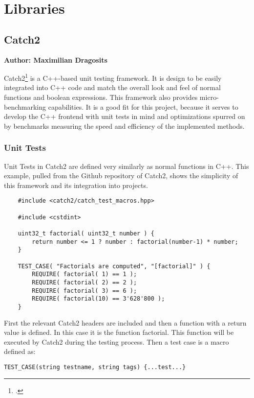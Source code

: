 \section{Libraries}

\subsection{Catch2}
\textbf{Author: Maximilian Dragosits}

Catch2\footcite{catch2_main_site} is a C++-based unit testing framework. It is design to be easily integrated into C++ code and match the overall look and feel
of normal functions and boolean expressions. This framework also provides micro-benchmarking capabilities. It is a good fit for this project, because it serves
to develop the C++ frontend with unit tests in mind and optimizations spurred on by benchmarks measuring the speed and efficiency of the implemented methods.

\subsubsection{Unit Tests}

Unit Tests in Catch2 are defined very similarly as normal functions in C++. This example, pulled from the Github repository of Catch2, shows the simplicity of
this framework and its integration into projects.

\begin{verbatim}
    #include <catch2/catch_test_macros.hpp>

    #include <cstdint>
    
    uint32_t factorial( uint32_t number ) {
        return number <= 1 ? number : factorial(number-1) * number;
    }
    
    TEST_CASE( "Factorials are computed", "[factorial]" ) {
        REQUIRE( factorial( 1) == 1 );
        REQUIRE( factorial( 2) == 2 );
        REQUIRE( factorial( 3) == 6 );
        REQUIRE( factorial(10) == 3'628'800 );
    }
\end{verbatim}

First the relevant Catch2 headers are included and then a function with a return value is defined. In this case it is the function factorial. 
This function will be executed by Catch2 during the testing process. Then a test case is a macro defined as:

\begin{verbatim}
TEST_CASE(string testname, string tags) {...test...}
\end{verbatim}

